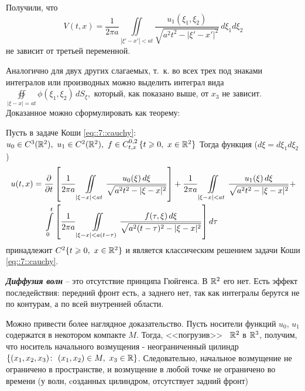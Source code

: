 \documentclass[../main.tex]{subfiles}
\begin{document}
Получили, что 
\[
V(t, x)=\frac{1}{2\pi a}\iint\limits_{|\xi' -x'|<at}\frac{u_1(\xi_1, \xi_2)}{\sqrt{a^2t^2-|\xi' -x'|^2}}\, d\xi_1d\xi_2
\]
не зависит от третьей переменной. 

Аналогично для двух других слагаемых, т.~к. во всех трех под знаками интегралов или производных можно выделить интеграл вида $\displaystyle\oiint\limits_{|\xi -x|=at}\phi (\xi_1, \xi_2)\, dS_{\xi}$,\, который, как показано выше, от $x_3$ не зависит. Доказанное можно сформулировать как теорему:

\begin{theorem}
Пусть в задаче Коши \eqref{eq::7::cauchy}:
$u_0 \in C^3(\R^2),\ 
u_1 \in C^2(\R^2),\
f \in C_{t,x}^{0,2}\, \{t\geq 0,\ x \in \R^2\}$ 
Тогда функция ($d\xi =d\xi_1d\xi_2$)
\[
\begin{split}
u(t,x) = \dfrac{\partial }{\partial t} &\left[ \frac{1}{2\pi a}
\iint\limits_{|\xi - x| < at} \frac{u_0(\xi)\, d\xi}{\sqrt{a^2t^2-|\xi - x|^2}} \right]
+ \frac{1}{2\pi a} \iint\limits_{|\xi - x|<at} \frac{u_1(\xi)\, d\xi}{\sqrt{a^2t^2-|\xi - x|^2}} +\\
\int\limits_0^t &\left[ \frac{1}{2\pi a}
\iint\limits_{|\xi - x| < a(t-\tau)} \frac{f(\tau,\xi)\, d\xi}{\sqrt{a^2(t-\tau )^2-|\xi - x|^2}} \right] d\tau
\end{split}
\]
принадлежит $C^2\{t\geqslant 0,\ x\in\mathbb{R}^2 \}$ и является классическим решением задачи Коши \eqref{eq::7::cauchy}.
\end{theorem}
\imaginarySubsection{Диффузия волн}
\begin{definition} \textbf{\emph{Диффузия волн}}
-- это отсутствие принципа Гюйгенса. В $\mathbb{R}^2$ его нет. Есть эффект последействия: передний фронт есть, а заднего нет, так как интегралы берутся не по контурам, а по всей внутренней области.
\end{definition}
Можно привести более наглядное доказательство. Пусть носители функций $u_0$, $u_1$ содержатся в некотором компакте $M$. Тогда, <<погрузив>>~ $\mathbb{R}^2$ в $\mathbb{R}^3$, получим, что носитель начального возмущения - неограниченный цилиндр $\{(x_1, x_2, x_3)\colon ~(x_1, x_2) \in M,~ x_3 \in \mathbb{R} \}$. Следовательно, начальное возмущение не ограничено в пространстве, и возмущение в любой точке не ограничено во времени (у волн, cозданных цилиндром, отсутствует задний фронт)
\end{document}
